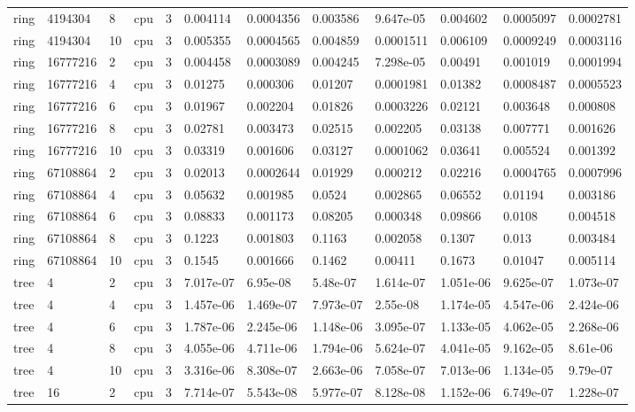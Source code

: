 \begin{tabular}{llllllllllll}
ring & 4194304 & 8 & cpu & 3 & 0.004114 & 0.0004356 & 0.003586 & 9.647e-05 & 0.004602 & 0.0005097 & 0.0002781 \\
ring & 4194304 & 10 & cpu & 3 & 0.005355 & 0.0004565 & 0.004859 & 0.0001511 & 0.006109 & 0.0009249 & 0.0003116 \\
ring & 16777216 & 2 & cpu & 3 & 0.004458 & 0.0003089 & 0.004245 & 7.298e-05 & 0.00491 & 0.001019 & 0.0001994 \\
ring & 16777216 & 4 & cpu & 3 & 0.01275 & 0.000306 & 0.01207 & 0.0001981 & 0.01382 & 0.0008487 & 0.0005523 \\
ring & 16777216 & 6 & cpu & 3 & 0.01967 & 0.002204 & 0.01826 & 0.0003226 & 0.02121 & 0.003648 & 0.000808 \\
ring & 16777216 & 8 & cpu & 3 & 0.02781 & 0.003473 & 0.02515 & 0.002205 & 0.03138 & 0.007771 & 0.001626 \\
ring & 16777216 & 10 & cpu & 3 & 0.03319 & 0.001606 & 0.03127 & 0.0001062 & 0.03641 & 0.005524 & 0.001392 \\
ring & 67108864 & 2 & cpu & 3 & 0.02013 & 0.0002644 & 0.01929 & 0.000212 & 0.02216 & 0.0004765 & 0.0007996 \\
ring & 67108864 & 4 & cpu & 3 & 0.05632 & 0.001985 & 0.0524 & 0.002865 & 0.06552 & 0.01194 & 0.003186 \\
ring & 67108864 & 6 & cpu & 3 & 0.08833 & 0.001173 & 0.08205 & 0.000348 & 0.09866 & 0.0108 & 0.004518 \\
ring & 67108864 & 8 & cpu & 3 & 0.1223 & 0.001803 & 0.1163 & 0.002058 & 0.1307 & 0.013 & 0.003484 \\
ring & 67108864 & 10 & cpu & 3 & 0.1545 & 0.001666 & 0.1462 & 0.00411 & 0.1673 & 0.01047 & 0.005114 \\
tree & 4 & 2 & cpu & 3 & 7.017e-07 & 6.95e-08 & 5.48e-07 & 1.614e-07 & 1.051e-06 & 9.625e-07 & 1.073e-07 \\
tree & 4 & 4 & cpu & 3 & 1.457e-06 & 1.469e-07 & 7.973e-07 & 2.55e-08 & 1.174e-05 & 4.547e-06 & 2.424e-06 \\
tree & 4 & 6 & cpu & 3 & 1.787e-06 & 2.245e-06 & 1.148e-06 & 3.095e-07 & 1.133e-05 & 4.062e-05 & 2.268e-06 \\
tree & 4 & 8 & cpu & 3 & 4.055e-06 & 4.711e-06 & 1.794e-06 & 5.624e-07 & 4.041e-05 & 9.162e-05 & 8.61e-06 \\
tree & 4 & 10 & cpu & 3 & 3.316e-06 & 8.308e-07 & 2.663e-06 & 7.058e-07 & 7.013e-06 & 1.134e-05 & 9.79e-07 \\
tree & 16 & 2 & cpu & 3 & 7.714e-07 & 5.543e-08 & 5.977e-07 & 8.128e-08 & 1.152e-06 & 6.749e-07 & 1.228e-07 \\

\end{tabular}
